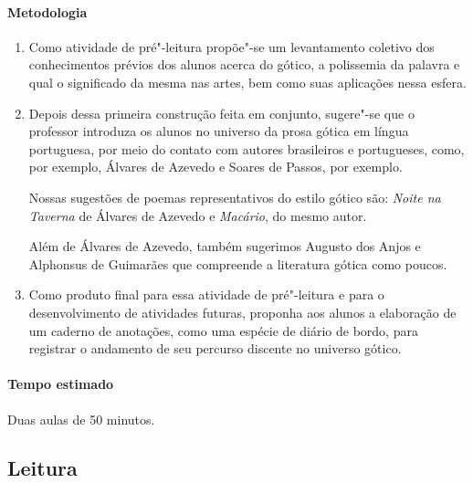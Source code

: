 \documentclass[12pt]{extarticle}
\begin{document}
\paragraph{Metodologia}

\begin{enumerate}
\item
Como atividade de pré"-leitura propõe"-se um levantamento coletivo dos
conhecimentos prévios dos alunos acerca do gótico, a polissemia da palavra e qual o
significado da mesma nas artes, bem como suas aplicações nessa esfera.

\item
Depois dessa primeira construção feita em conjunto, sugere"-se que o professor introduza 
os alunos no universo da prosa gótica em língua portuguesa, por meio do contato com
autores brasileiros e portugueses, como, por exemplo, Álvares de Azevedo
e Soares de Passos, por exemplo. 

Nossas sugestões de poemas representativos do estilo gótico são: \emph{Noite na Taverna} 
de Álvares de Azevedo e \emph{Macário}, do mesmo autor.

Além de Álvares de Azevedo, também sugerimos Augusto dos Anjos e
Alphonsus de Guimarães que compreende a literatura gótica como poucos.




\item
Como produto final para essa atividade de pré"-leitura e para o desenvolvimento de atividades 
futuras, proponha aos alunos a elaboração de um caderno de anotações, como uma espécie de diário de bordo, 
para registrar o andamento de seu percurso discente no universo gótico.

\end{enumerate}

\paragraph{Tempo estimado} Duas aulas de 50 minutos. 

\subsection{Leitura}  
\end{document}
